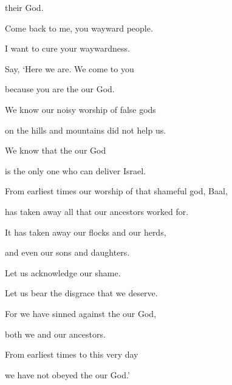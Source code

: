 {{}
their God.
\par }{\Q {}Come back
to me, you wayward
people.
\par }{\Q I want to cure
your waywardness.
\par }{\Q Say, ‘Here
we are. We come
to you
\par }{\Q because
you
are the
{}
our God.
\par }{\Q {}We know
our noisy
worship of false gods
\par }{\Q on the hills
and mountains
did not help us.

\par }{\Q We know
that the
{}
our God
\par }{\Q is the only one who can deliver
Israel.
\par }{\Q {}From earliest times our worship of that shameful
god, Baal,
\par }{\Q has taken away
all that our ancestors
worked
for.
\par }{\Q It has taken away our flocks
and our herds,
\par }{\Q and even our sons
and daughters.
\par }{\Q {}Let us acknowledge
our shame.
\par }{\Q Let us bear the disgrace
that we
deserve.

\par }{\Q For
we have sinned
against the
{}
our God,
\par }{\Q both we
and our ancestors.
\par }{\Q From earliest
times to this very
day
\par }{\Q we have not
obeyed
the {}
our God.’

\par }
